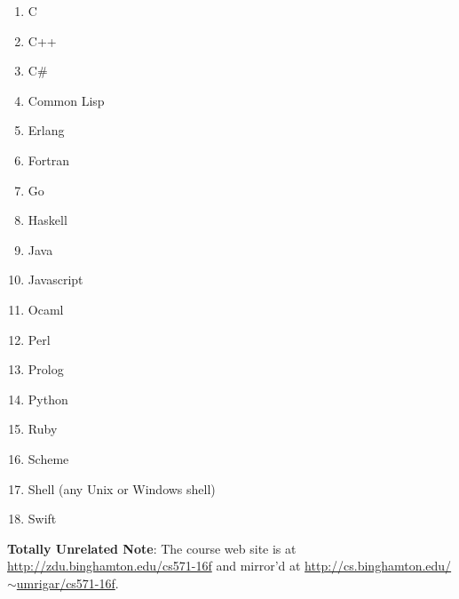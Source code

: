 \documentclass[12pt]{article}
\begin{document}
\begin{enumerate}

\item C
\item C++
\item C\#
\item Common Lisp
\item Erlang
\item Fortran
\item Go
\item Haskell
\item Java
\item Javascript
\item Ocaml
\item Perl
\item Prolog
\item Python
\item Ruby
\item Scheme
\item Shell (any Unix or Windows shell)
\item Swift

\end{enumerate}

\textbf{Totally Unrelated Note}: The course web site is at
\href{http://zdu.binghamton.edu/cs571-16f}{http://zdu.binghamton.edu/cs571-16f}
and mirror'd at \href{http://cs.binghamton.edu/~umrigar/cs571-16f}{http://cs.binghamton.edu/$\mathtt{\sim}$umrigar/cs571-16f}.
\end{document}

